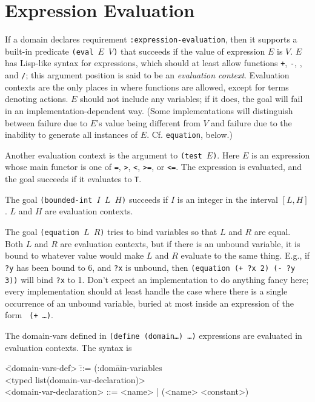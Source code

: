 \section{Expression Evaluation}
\label{expeval}

If a domain declares requirement  {\tt :expression-evaluation}, then
it supports a built-in predicate {\tt (eval $E$ $V$)} that succeeds if
the value of expression $E$ is $V$.  $E$ has Lisp-like syntax for
expressions, which should at least allow functions {\tt +}, {\tt -},
{\tt *}, and {\tt /}; this argument position is said to be an {\em evaluation
context}.  Evaluation contexts are
the only places in \lang{} where functions are
allowed, except for terms denoting actions.   
$E$ should not include any variables; if it does, the goal
will fail in an implementation-dependent way.  (Some implementations
will distinguish between failure due to $E$'s value being different from
$V$ and failure due to the inability to generate all instances of
$E$.  Cf. {\tt equation}, below.)

Another evaluation context is the argument to {\tt (test $E$)}.  Here
$E$ is an expression whose main functor is one of {\tt =}, {\tt >},
{\tt <}, {\tt >=}, or
{\tt <=}.  The expression is evaluated, and the goal succeeds if it
evaluates to {\tt T}.

The goal {\tt (bounded-int $I$ $L$ $H$)} succeeds if $I$ is an integer
in the interval $[L,H]$.  $L$ and $H$ are evaluation contexts.

The goal {\tt (equation $L$ $R$)} tries to bind variables so
that $L$ and $R$ are equal.  Both $L$ and $R$ are evaluation contexts,
but if there is an unbound variable, it is bound to whatever value
would make $L$ and $R$ evaluate to the same thing.  E.g., if {\tt ?y}
has been bound to 6, and {\tt ?x} is unbound, then {\tt (equation (+
?x 2) (- ?y 3))} will bind {\tt ?x} to 1.  Don't expect an
implementation to do anything fancy here; every implementation should
at least handle the case where there is a single occurrence of an
unbound variable, buried at most inside an expression of the form {\tt
(+ \ldots)}.  

The domain-vars defined in {\tt (define (domain\ldots) \ldots)} expressions are evaluated
in evaluation contexts.  The syntax is 
\begin{tabtt}
\bump \= <domain-vars-def> \bump \=::= (:dom\=ain-variables \+\+\+\\
                                                  <typed list(domain-var-declaration)> \-\-\\
     <domain-var-declaration> \> ::= <name> | (<name> <constant>) 
\end{tabtt}

